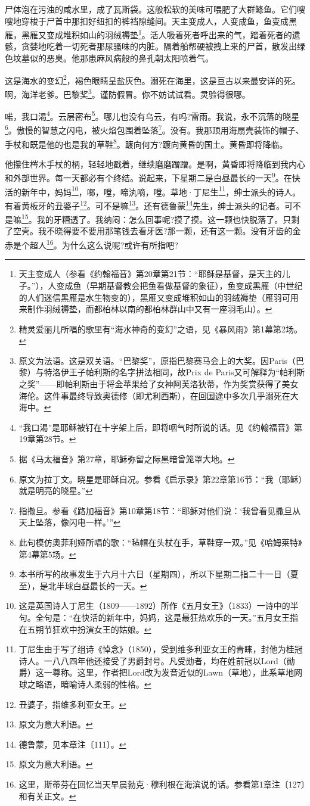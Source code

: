 \par 尸体泡在污浊的咸水里，成了瓦斯袋。这般松软的美味可喂肥了大群鲦鱼。它们嗖嗖地穿梭于尸首中那扣好纽扣的裤裆隙缝间。天主变成人，人变成鱼，鱼变成黑雁，黑雁又变成堆积如山的羽绒褥垫\footnote{天主变成人（参看《约翰福音》第20章第21节：“耶稣是基督，是天主的儿子。”），人变成鱼（早期基督教会把鱼看做基督的象征），鱼变成黑雁（中世纪的人们迷信黑雁是水生物变的），黑雁又变成堆积如山的羽绒褥垫（雁羽可用来制作羽绒褥垫，而都柏林以南的都柏林群山中又有一座羽毛山）。}。活人吸着死者呼出来的气，踏着死者的遗骸，贪婪地吃着一切死者那尿骚味的内脏。隔着船帮硬被拽上来的尸首，散发出绿色坟墓似的恶臭。他那患麻风病般的鼻孔朝太阳喷着气。
\par 这是海水的变幻\footnote{精灵爱丽儿所唱的歌里有“海水神奇的变幻”之语，见《暴风雨》第1幕第2场。}，褐色眼睛呈盐灰色。溺死在海里，这是亘古以来最安详的死。啊，海洋老爹。巴黎奖\footnote{原文为法语。这是双关语。“巴黎奖”，原指巴黎赛马会上的大奖。因Paris（巴黎）与特洛伊王子帕利斯的名字拼法相同，故Prix de Paris又可解释为“帕利斯之奖”——即帕利斯由于将金苹果给了女神阿芙洛狄蒂，作为奖赏获得了美女海伦。这件事最终导致奥德修（即尤利西斯），在回国途中多次几乎溺死在大海中。}。谨防假冒。你不妨试试看。灵验得很哪。
\par 喏，我口渴\footnote{“我口渴”是耶稣被钉在十字架上后，即将咽气时所说的话。见《约翰福音》第19章第28节。}。云层密布\footnote{据《马太福音》第27章，耶稣弥留之际黑暗曾笼罩大地。}。哪儿也没有乌云，有吗?雷雨。我说，永不沉落的晓星\footnote{原文为拉丁文。晓星是耶稣自况。参看《启示录》第22章第16节：“我（耶稣）就是明亮的晓星。”}。傲慢的智慧之闪电，被火焰包围着坠落\footnote{指撒旦。参看《路加福音》第10章第18节：“耶稣对他们说：‘我曾看见撒旦从天上坠落，像闪电一样。’”}。没有。我那顶用海扇壳装饰的帽子、手杖和既是他的也是我的草鞋\footnote{此句模仿奥菲利娅所唱的歌：“毡帽在头杖在手，草鞋穿一双。”见《哈姆莱特》第4幕第5场。}。踱向何方?踱向黄昏的国土。黄昏即将降临。
\par 他攥住梣木手杖的柄，轻轻地戳着，继续磨磨蹭蹭。是啊，黄昏即将降临到我内心和外部世界。每一天都必有个终结。说起来，下星期二是白昼最长的一天\footnote{本书所写的故事发生于六月十六日（星期四），所以下星期二指二十一日（夏至），是北半球白昼最长的一天。}。在快活的新年中，妈妈\footnote{这是英国诗人丁尼生（1809——1892）所作《五月女王》（1833）一诗中的半句。全句是：“在快活的新年中，妈妈，这是最狂热欢乐的一天。”五月女王指在五朔节狂欢中扮演女王的姑娘。}，啷，嘡，啼汍嘀，嘡。草地·丁尼生\footnote{丁尼生由于写了组诗《悼念》（1850），受到维多利亚女王的青睐，封他为桂冠诗人。一八八四年他还接受了男爵封号。凡受勋者，均在姓前冠以Lord（勋爵）这一尊称。这里，作者把Lord改为发音近似的Lawn（草地），此系草地网球之略语，暗喻诗人柔弱的性格。}，绅士派头的诗人。有着黄板牙的丑婆子\footnote{丑婆子，指维多利亚女王。}。可不是嘛\footnote{原文为意大利语。}。还有德鲁蒙\footnote{德鲁蒙，见本章注〔111〕。}先生，绅士派头的记者。可不是嘛\footnote{原文为意大利语。}。我的牙糟透了。我纳闷：怎么回事呢?摸了摸。这一颗也快脱落了。只剩了空壳。我不晓得要不要用那笔钱去看牙医?那一颗，还有这一颗。没有牙齿的金赤是个超人\footnote{这里，斯蒂芬在回忆当天早晨勃克·穆利根在海滨说的话。参看第1章注〔127〕和有关正文。}。为什么这么说呢?或许有所指吧?
